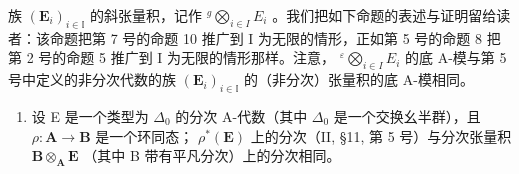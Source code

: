 族 \((\mathbf{E}_{i})_{i\in\mathbb{I}}\) 的斜张量积，记作 \({}^{g}\bigotimes_{i\in I}E_{i}\) 。我们把如下命题的表述与证明留给读者：该命题把第 7 号的命题 10 推广到 I 为无限的情形，正如第 5 号的命题 8 把第 2 号的命题 5 推广到 I 为无限的情形那样。注意， \({}^{\varepsilon}\bigotimes_{i\in I}E_{i}\) 的底 A-模与第 5 号中定义的非分次代数的族 \((\mathbf{E}_{i})_{i\in\mathbb{I}}\) 的（非分次）张量积的底 A-模相同。

\begin{enumerate}
\def\labelenumi{(\arabic{enumi})}
\setcounter{enumi}{1}
\tightlist
\item
  设 E 是一个类型为 \(\Delta_0\) 的分次 A-代数（其中 \(\Delta_0\) 是一个交换幺半群），且 \(\rho: \mathbf{A} \to \mathbf{B}\) 是一个环同态； \(\rho^*(\mathbf{E})\) 上的分次（II, §11, 第 5 号）与分次张量积 \(\mathbf{B} \otimes_{\mathbf{A}} \mathbf{E}\) （其中 B 带有平凡分次）上的分次相同。
\end{enumerate}
\relax{}
